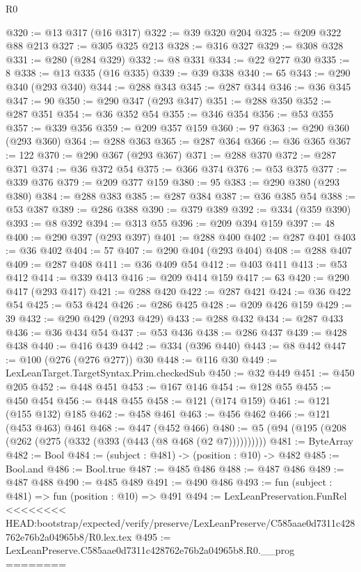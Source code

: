 \begin{lexlean}{R0}
\begin{coremodule}
{{{{{{{{{{{{{{{{{{{@320 := @13 @317 (@16 @317)
@322 := @39 @320 @204
@325 := @209 @322 @88 @213
@327 := @305 @325 @213
@328 := @316 @327
@329 := @308 @328
@331 := @280 (@284 @329)
@332 := @8 @331
@334 := @22 @277 @30
@335 := 8
@338 := @13 @335 (@16 @335)
@339 := @39 @338
@340 := 65
@343 := @290 @340 (@293 @340)
@344 := @288 @343
@345 := @287 @344
@346 := @36 @345
@347 := 90
@350 := @290 @347 (@293 @347)
@351 := @288 @350
@352 := @287 @351
@354 := @36 @352 @54
@355 := @346 @354
@356 := @53 @355
@357 := @339 @356
@359 := @209 @357 @159
@360 := 97
@363 := @290 @360 (@293 @360)
@364 := @288 @363
@365 := @287 @364
@366 := @36 @365
@367 := 122
@370 := @290 @367 (@293 @367)
@371 := @288 @370
@372 := @287 @371
@374 := @36 @372 @54
@375 := @366 @374
@376 := @53 @375
@377 := @339 @376
@379 := @209 @377 @159
@380 := 95
@383 := @290 @380 (@293 @380)
@384 := @288 @383
@385 := @287 @384
@387 := @36 @385 @54
@388 := @53 @387
@389 := @286 @388
@390 := @379 @389
@392 := @334 (@359 @390)
@393 := @8 @392
@394 := @313 @55
@396 := @209 @394 @159
@397 := 48
@400 := @290 @397 (@293 @397)
@401 := @288 @400
@402 := @287 @401
@403 := @36 @402
@404 := 57
@407 := @290 @404 (@293 @404)
@408 := @288 @407
@409 := @287 @408
@411 := @36 @409 @54
@412 := @403 @411
@413 := @53 @412
@414 := @339 @413
@416 := @209 @414 @159
@417 := 63
@420 := @290 @417 (@293 @417)
@421 := @288 @420
@422 := @287 @421
@424 := @36 @422 @54
@425 := @53 @424
@426 := @286 @425
@428 := @209 @426 @159
@429 := 39
@432 := @290 @429 (@293 @429)
@433 := @288 @432
@434 := @287 @433
@436 := @36 @434 @54
@437 := @53 @436
@438 := @286 @437
@439 := @428 @438
@440 := @416 @439
@442 := @334 (@396 @440)
@443 := @8 @442
@447 := @100 (@276 (@276 @277)) @30
@448 := @116 @30
@449 := LexLeanTarget.TargetSyntax.Prim.checkedSub
@450 := @32 @449
@451 := @450 @205
@452 := @448 @451
@453 := @167 @146
@454 := @128 @55
@455 := @450 @454
@456 := @448 @455
@458 := @121 (@174 @159)
@461 := @121 (@155 @132) @185
@462 := @458 @461
@463 := @456 @462
@466 := @121 (@453 @463) @461
@468 := @447 (@452 @466)
@480 := @5 (@94 (@195 (@208 (@262 (@275 (@332 (@393 (@443 (@8 @468 (@2 @7))))))))))
@481 := ByteArray
@482 := Bool
@484 := (subject : @481) -> (position : @10) -> @482
@485 := Bool.and
@486 := Bool.true
@487 := @485 @486
@488 := @487 @486
@489 := @487 @488
@490 := @485 @489
@491 := @490 @486
@493 := fun (subject : @481) => fun (position : @10) => @491
@494 := LexLeanPreservation.FunRel
<<<<<<<< HEAD:bootstrap/expected/verify/preserve/LexLeanPreserve/C585aae0d7311c428762e76b2a04965b8/R0.lex.tex
@495 := LexLeanPreserve.C585aae0d7311c428762e76b2a04965b8.R0.__prog
========
}}}}}}}}}}}}}}}}}}}
\end{coremodule}
\end{lexlean}
